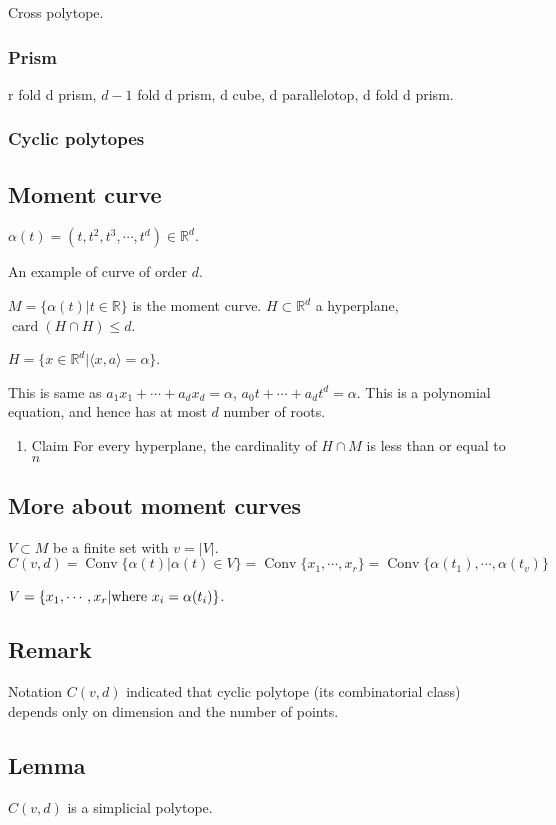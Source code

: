 \documentclass[11pt]{article}
\def\R{\mathbb{R}}
\def\conv{\operatorname{Conv}}
\begin{document}
{{Cross polytope.
\subsubsection{Prism}
\label{sec:org347afad}
r fold d prism, \(d-1\) fold d prism, d cube, d parallelotop, d fold d prism.
\subsubsection{Cyclic polytopes}
\label{sec:org799480e}
\subsection{Moment curve}
\label{sec:orge147e94}
\(\alpha(t) = (t, t^2, t^3, \cdots, t^d) \in \R^d\).

An example of curve of order \(d\).

\(M = \{\alpha(t) \vert t \in \R\}\) is the moment curve. \(H \subset \R^d\) a
hyperplane, \(\operatorname{card}(H \cap H) \le d\).

\(H = \{x \in \R^d \vert \langle x, a \rangle = \alpha \}\).

This is same as \(a_1 x_1 + \cdots + a_d x_d = \alpha\), \(a_0t + \cdots + a_d
   t^d = \alpha\). This is a polynomial equation, and hence has at most \(d\)
number of roots.

\begin{enumerate}
\item Claim
\label{sec:orgcff563b}
For every hyperplane, the cardinality of \(H \cap M\) is less than or equal to \(n\)
\end{enumerate}
\subsection{More about moment curves}
\label{sec:orgd7b0720}
\(V \subset M\) be a finite set with \(v = \vert V \vert\). \(C(v, d) =
   \conv\{\alpha(t) \vert \alpha(t) \in V\} = \conv\{x_1, \cdots, x_r\} =
   \conv\{\alpha(t_1), \cdots, \alpha(t_v)\}\)

\(V = \{x_1, \cdots, x_r \vert \textup{where } x_i = \alpha(t_i)\}\).
\subsection{Remark}
\label{sec:orgfc55c11}
Notation \(C(v, d)\) indicated that cyclic polytope (its combinatorial class)
depends only on dimension and the number of points.
\subsection{Lemma}
\label{sec:org9dd9287}
\(C(v, d)\) is a simplicial polytope.
}}
\end{document}
